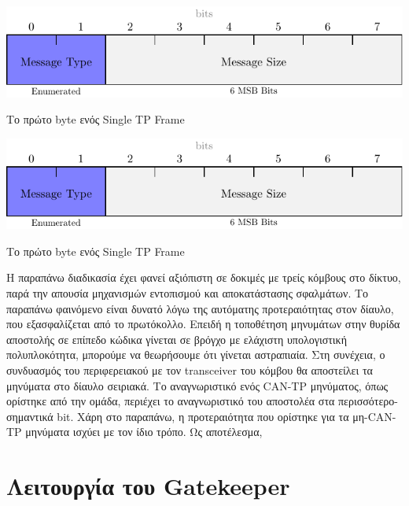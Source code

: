 \documentclass[a4paper,nobib,justified]{tufte-book}
\begin{document}
\begin{marginfigure}
	\includegraphics[width=\textwidth]{media/diagrams/tp-single-first-byte.pdf}
	\caption{Το πρώτο byte ενός Single TP Frame}
	\label{fig:tp-single-frame-first-byte}

	\goodbreak

	\includegraphics[width=\textwidth]{media/diagrams/tp-single-first-byte.pdf}
	\caption{Το πρώτο byte ενός Single TP Frame}
	\label{fig:tp-overview}
\end{marginfigure}

Η παραπάνω διαδικασία έχει φανεί αξιόπιστη σε δοκιμές με τρείς κόμβους στο δίκτυο, παρά την απουσία μηχανισμών εντοπισμού και αποκατάστασης σφαλμάτων. Το παραπάνω φαινόμενο είναι δυνατό λόγω της αυτόματης προτεραιότητας στον δίαυλο, που εξασφαλίζεται από το πρωτόκολλο. Επειδή η τοποθέτηση μηνυμάτων στην θυρίδα αποστολής σε επίπεδο κώδικα γίνεται σε βρόγχο με ελάχιστη υπολογιστική πολυπλοκότητα, μπορούμε να θεωρήσουμε ότι γίνεται αστραπιαία. Στη συνέχεια, ο συνδυασμός του περιφερειακού με τον transceiver του κόμβου θα αποστείλει τα μηνύματα στο δίαυλο σειριακά. Το αναγνωριστικό ενός CAN-TP μηνύματος, όπως ορίστηκε από την ομάδα, περιέχει το αναγνωριστικό του αποστολέα στα περισσότερο-σημαντικά bit. Χάρη στο παραπάνω, η προτεραιότητα που ορίστηκε για τα μη-CAN-TP μηνύματα ισχύει με τον ίδιο τρόπο. Ως αποτέλεσμα, 

\section{Λειτουργία του Gatekeeper} \label{gatekeeper}
\end{document}
